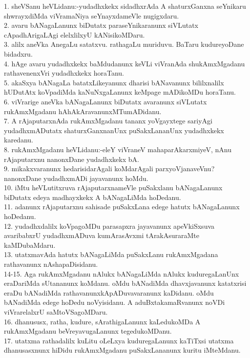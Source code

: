 \documentclass{article}
\begin{document}
1. sheVSanu heVLidanu:-yudadhxkekx sidadhxrAda A shaturxGanxna seYnikaru shwrayxdiMda viVramaNiya seYnayxdameVle nugigxdaru.\\
2. avaru bANagaLanunx biDutatx paraseYnikaranunx siVLutatx cApadhArigaLAgi elelxlilxyU kANisikoMDaru.\\
3. alilx aneVka AnegaLu satatxvu. rathagaLu muriduvu. BaTaru kudureyoDane bidadxru.\\
4. hAge avaru yudadhxkekx baMdudanunx keVLi viVranAda shukAmxMgadanu rathavenenxVri yudadhxkekx horaTanu.\\
5. akaSxya bANagaLa batatxLikeyanunx dharisi bANavanunx bililxnalilx hUDutAtx koVpadiMda kaNuNxgaLanunx keMpage mADikoMDu horaTanu.\\
6. viVrarige aneVka bANagaLanunx biDutatx avaranunx siVLutatx rukAmxMgadanu hAhAkAravanunxMTumADidanu.\\
7. A rAjaputarxnAda rukAmxMgadanu tananx yoVgayxtege sariyAgi yudadhxmADutatx shaturxGanxnanUnx puSakxLananUnx yudadhxkekx karedanu.\\
8. rukAmxMgadanu heVLidanu:-eleY viVraneV mahaparAkarxmiyeV, nAnu rAjaputarxnu nanonxDane yudadhxkekx bA.\\
9. mikakxvaranunx hedarisidarAgali koMdarAgali parxyoVjanaveVnu? nanonxDane yudadhxmADi jayavanunx hoMdu.\\
10. iMtu heVLutitxruva rAjaputarxnameVle puSakxlanu bANagaLanunx biDutatx edeya madhayxkekx A bANagaLiMda hoDedanu.\\
11. adanunx rAjaputarxnu sahisade puSakxLana edege hatutx bANagaLanunx hoDedanu.\\
12. yudadhxdalilx koVpagoMDu parasapxra jayavanunx apeVkiSxsuva avaribabxrU yudadhxmADuva kumArasAvxmi tArakAsuraraMte kaMDubaMdaru.\\
13. utatxmavAda hatutx bANagaLiMda puSakxLanu rukAmxMgadana rathavanunx nAshapaDisidanu.\\
14-15. Aga rukAmxMgadanu nAlukx bANagaLiMda nAlukx kuduregaLanUnx eraDariMda sUtananunx koMdanu. oMdu bANadiMda dhavxjavanunx katatxrisi eraDu bANadiMda rathavanunxkApADuvavaranunx kaDidanu. oMdu bANadiMda edege hoDedu noVyisidanu. A aduBxtakamaRvanunx noVDi viVrarelalxrU saMtoVSagoMDaru.\\
16. dhanususx, ratha, kudure, sArathigaLanunx kaLedukoMDa A rukAmxMgadanu beVreyavugaLanunx tegedukoMDanu.\\
17. utatxma rathadalilx kuLitu oLeLxya kuduregaLanunx kaTiTxsi utatxma dhanusasxnunx hiDidu rukAmxMgadanu puSakxLananunx kuritu iMteMdanu.\\
\end{document}
